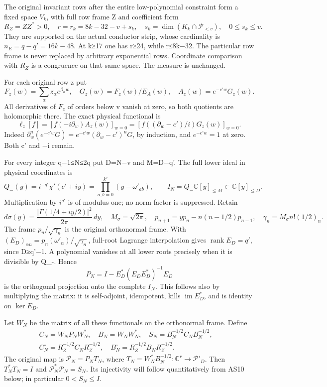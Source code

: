 \documentclass[11pt]{article}
\begin{document}
The original invariant rows after the entire low-polynomial constraint form a fixed space \(V_k\), with full row frame Z and coefficient form \[
R_Z=ZZ^*>0,\quad r=r_k=8k-32-v+s_k,\quad
s_k=\dim(K_k\cap\mathcal P_{<v}),\quad0\le s_k\le v.
\] They are supported on the actual conductor strip, whose cardinality is \(n_E=q-q'=16k-48\). At k≥17 one has r≥24, while r≤8k−32. The particular row frame is never replaced by arbitrary exponential rows. Coordinate comparison with \(R_Z\) is a congruence on that same space. The measure is unchanged.

For each original row z put \[
F_z(w)=\sum_\alpha z_\alpha e^{\beta_\alpha w},\quad
G_z(w)=F_z(w)/E_A(w),\quad A_z(w)=e^{-c'w}G_z(w).
\tag{AS1}
\] All derivatives of \(F_z\) of orders below v vanish at zero, so both quotients are holomorphic there. The exact physical functional is \[
\ell_z[f]=[f(-i\partial_w)A_z(w)]_{w=0}
=[f((\partial_w-c')/i)G_z(w)]_{w=0}.
\tag{AS2}
\] Indeed \(\partial_w^n(e^{-c'w}G)=e^{-c'w}(\partial_w-c')^nG\), by induction, and \(e^{-c'w}=1\) at zero. Both c' and −i remain.

For every integer q−1≤N≤2q put D=N−v and M=D−q'. The full lower ideal in physical coordinates is \[
Q_-(y)=i^{-q'}\chi'(c'+iy)=\prod_{a,b=0}^{k'}(y-\omega'_{ab}),
\qquad I_N=Q_-\mathbb C[y]_{\le M}\subset\mathbb C[y]_{\le D}.
\tag{AS3}
\] Multiplication by \(i^{q'}\) is of modulus one; no norm factor is suppressed. Retain \[
d\sigma(y)=\frac{|\Gamma(1/4+iy/2)|^2}{2\pi}\,dy,
\quad M_\sigma=\sqrt{2\pi},
\quad p_{n+1}=yp_n-n(n-1/2)p_{n-1},
\quad\gamma_n=M_\sigma n!(1/2)_n.
\] The frame \(p_n/\sqrt{\gamma_n}\) is the original orthonormal frame. With \((E_D)_{\alpha n}=p_n(\omega'_\alpha)/\sqrt{\gamma_n}\), full-root Lagrange interpolation gives \(\operatorname{rank}E_D=q'\), since D≥q'−1. A polynomial vanishes at all lower roots precisely when it is divisible by Q\_-. Hence \[
P_N=I-E_D^*(E_DE_D^*)^{-1}E_D
\tag{AS4}
\] is the orthogonal projection onto the complete \(I_N\). This follows also by multiplying the matrix: it is self-adjoint, idempotent, kills \(\operatorname{im}E_D^*\), and is identity on \(\ker E_D\).

Let \(W_N\) be the matrix of all these functionals on the orthonormal frame. Define \[
\begin{gathered}C_N=W_NP_NW_N^*,\quad B_N=W_NW_N^*,\quad
S_N=B_N^{-1/2}C_NB_N^{-1/2},\quad
\\ C_N^\circ=R_Z^{-1/2}C_NR_Z^{-1/2},\quad
B_N^\circ=R_Z^{-1/2}B_NR_Z^{-1/2}.
\end{gathered}\tag{AS5}\] The original map is \(\mathcal P_N=P_NT_N\), where \(T_N=W_N^*B_N^{-1/2}:\mathbb C^r\to\mathcal P'_D\). Then \(T_N^*T_N=I\) and \(\mathcal P_N^*\mathcal P_N=S_N\). Its injectivity will follow quantitatively from AS10 below; in particular \(0<S_N\le I\).
\end{document}
